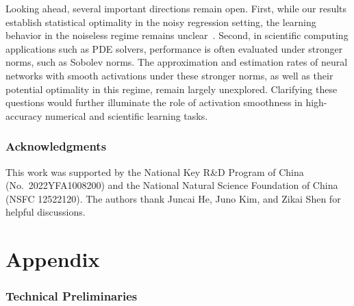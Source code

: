 \documentclass[11pt]{article}
\begin{document}
Looking ahead, several important directions remain open. 
First, while our results establish statistical optimality in the noisy  regression setting, the  learning behavior  in the noiseless regime remains unclear~\citep{chen2025duality}.
Second, in scientific computing applications such as PDE solvers, performance is often evaluated under stronger norms, such as  Sobolev norms. 
The approximation and estimation rates of neural networks with smooth activations under these stronger norms, as well as their potential optimality in this regime, remain largely unexplored. 
Clarifying these questions would further illuminate the role of activation smoothness in high-accuracy numerical and scientific learning tasks.

\section*{Acknowledgments}
This work was supported by the National Key R\&D Program of China (No.~2022YFA1008200) and the National Natural Science Foundation of China (NSFC 12522120). The authors thank Juncai He, Juno Kim, and Zikai Shen for helpful discussions.





\newpage


\appendix
\part{Appendix}
\parttoc

\section{Technical Preliminaries}
\end{document}
